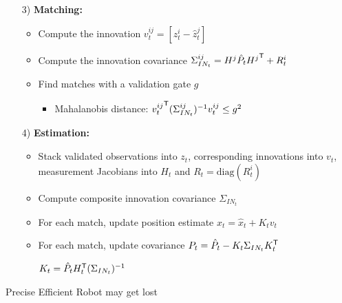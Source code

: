 \begin{itemize}
\begin{itemize}
\begin{itemize}
                    \item[3)] \textbf{Matching:}
                        \begin{itemize}
                            \item Compute the innovation $v_t^{ij} = [z_t^i - \hat z_t^j]$
                            \item Compute the innovation covariance $\Sigma_{IN_t}^{ij} = H^j \hat P_t {H^j}^{\mathsf{T}} + R_t^i$
                            \item Find matches with a validation gate $g$
                                \begin{itemize}
                                    \item Mahalanobis distance: ${v_t^{ij}}^{\mathsf{T}} (\Sigma_{IN_t}^{ij})^{-1} v_t^{ij} \le g^2$
                                \end{itemize}
                        \end{itemize}
                    \item[4)] \textbf{Estimation:}
                        \begin{itemize}
                            \item Stack validated observations into $z_t$, corresponding innovations into $v_t$, measurement Jacobians into $H_t$ and $R_t = \mathrm{diag}(R_t^i)$
                            \item Compute composite innovation covariance $\Sigma_{IN_t}$
                            \item For each match, update position estimate $x_t = \hat x_t + K_t v_t$
                            \item For each match, update covariance $P_t = \hat P_t - K_t \Sigma_{IN_t}K_t^{\mathsf{T}}$
                                \begin{itemize}
                                     $K_t = \hat P_t H_t^{\mathsf{T}} (\Sigma_{IN_t})^{-1}$
                                \end{itemize}
                        \end{itemize}
                \end{itemize}
        \end{itemize}
    \ipro Precise
    \ipro Efficient
    \icon Robot may get lost
\end{itemize}

